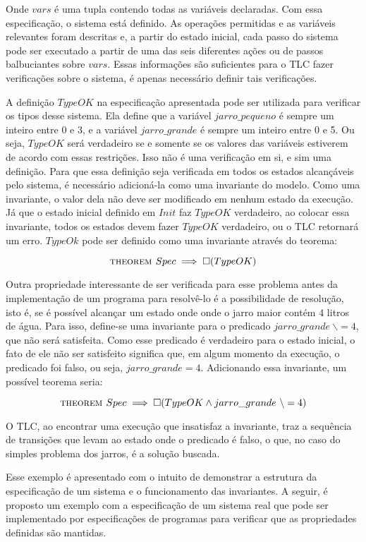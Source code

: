 Onde $vars$ é uma tupla contendo todas as variáveis declaradas. Com essa especificação, o sistema está definido. As operações permitidas e as variáveis relevantes foram descritas e, a partir do estado inicial, cada passo do sistema pode ser executado a partir de uma das seis diferentes ações ou de passos balbuciantes sobre $vars$. Essas informações são suficientes para o TLC fazer verificações sobre o sistema, é apenas necessário definir tais verificações.

A definição $TypeOK$ na especificação apresentada pode ser utilizada para verificar os tipos desse sistema. Ela define que a variável $jarro\_pequeno$ é sempre um inteiro entre 0 e 3, e a variável $jarro\_grande$ é sempre um inteiro entre 0 e 5. Ou seja, $TypeOK$ será verdadeiro se e somente se os valores das variáveis estiverem de acordo com essas restrições. Isso não é uma verificação em si, e sim uma definição. Para que essa definição seja verificada em todos os estados alcançáveis pelo sistema, é necessário adicioná-la como uma invariante do modelo. Como uma invariante, o valor dela não deve ser modificado em nenhum estado da execução. Já que o estado inicial definido em $Init$ faz $TypeOK$ verdadeiro, ao colocar essa invariante, todos os estados devem fazer $TypeOK$ verdadeiro, ou o TLC retornará um erro. $TypeOk$ pode ser definido como uma invariante através do teorema:

\[\textsc{theorem } Spec \implies \square (TypeOK)\]

Outra propriedade interessante de ser verificada para esse problema antes da implementação de um programa para resolvê-lo é a possibilidade de resolução, isto é, se é possível alcançar um estado onde onde o jarro maior contém 4 litros de água. Para isso, define-se uma invariante para o predicado $jarro\_grande\ \backslash= 4$, que não será satisfeita. Como esse predicado é verdadeiro para o estado inicial, o fato de ele não ser satisfeito significa que, em algum momento da execução, o predicado foi falso, ou seja, $jarro\_grande = 4$. Adicionando essa invariante, um possível teorema seria:

\[\textsc{theorem } Spec \implies \square (TypeOK \land jarro\_grande\ \backslash= 4)\]

O TLC, ao encontrar uma execução que insatisfaz a invariante, traz a sequência de transições que levam ao estado onde o predicado é falso, o que, no caso do simples problema dos jarros, é a solução buscada.

Esse exemplo é apresentado com o intuito de demonstrar a estrutura da especificação de um sistema e o funcionamento das invariantes. A seguir, é proposto um exemplo com a especificação de um sistema real que pode ser implementado por especificações de programas para verificar que as propriedades definidas são mantidas. %

